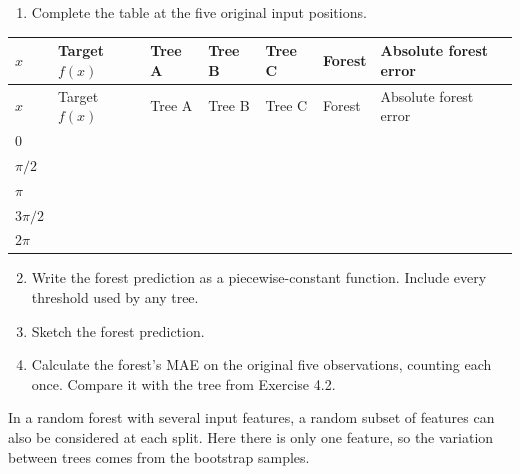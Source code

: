 \documentclass[10pt]{article}
\begin{document}
\begin{enumerate}
\item
Complete the table at the five original input positions.

\end{enumerate}
\begingroup
\small
\setlength{\tabcolsep}{4pt}
\begin{longtable}{l|l|l|l|l|l|l}
$x$ & Target $f(x)$ & Tree A & Tree B & Tree C & Forest & Absolute forest error \\
\hline
\endfirsthead
$x$ & Target $f(x)$ & Tree A & Tree B & Tree C & Forest & Absolute forest error \\
\hline
\endhead
$0$ & $\phantom{0}$ & $\phantom{0}$ & $\phantom{0}$ & $\phantom{0}$ & $\phantom{0}$ & $\phantom{0}$ \\[3pt]
$\pi/2$ & $\phantom{0}$ & $\phantom{0}$ & $\phantom{0}$ & $\phantom{0}$ & $\phantom{0}$ & $\phantom{0}$ \\[3pt]
$\pi$ & $\phantom{0}$ & $\phantom{0}$ & $\phantom{0}$ & $\phantom{0}$ & $\phantom{0}$ & $\phantom{0}$ \\[3pt]
$3\pi/2$ & $\phantom{0}$ & $\phantom{0}$ & $\phantom{0}$ & $\phantom{0}$ & $\phantom{0}$ & $\phantom{0}$ \\[3pt]
$2\pi$ & $\phantom{0}$ & $\phantom{0}$ & $\phantom{0}$ & $\phantom{0}$ & $\phantom{0}$ & $\phantom{0}$ \\[3pt]
\end{longtable}
\endgroup
\begin{enumerate}
\setcounter{enumi}{1}
\item
Write the forest prediction as a piecewise-constant function. Include every threshold used by any tree.

\item
Sketch the forest prediction.

\item
Calculate the forest's MAE on the original five observations, counting each once. Compare it with the tree from Exercise 4.2.

\end{enumerate}
In a random forest with several input features, a random subset of features can also be considered at each split. Here there is only one feature, so the variation between trees comes from the bootstrap samples.

\begingroup\color{red}
\end{document}

